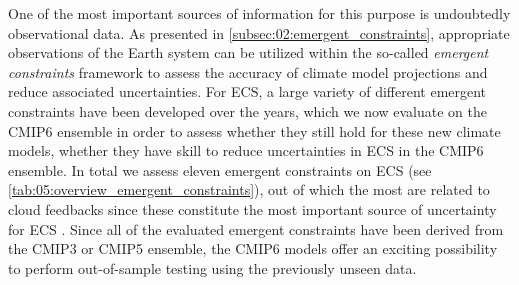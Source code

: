 One of the most important sources of information for this purpose is
undoubtedly observational data. As presented in
\cref{subsec:02:emergent_constraints}, appropriate observations of the Earth
system can be utilized within the so-called \emph{emergent constraints}
framework to assess the accuracy of climate model projections and reduce
associated uncertainties. For \ac{ECS}, a large variety of different emergent
constraints have been developed over the years, which we now evaluate on the
\acs{CMIP}6 ensemble in order to assess whether they still hold for these new
climate models, \ie{} whether they have skill to reduce uncertainties in
\ac{ECS} in the \acs{CMIP}6 ensemble. In total we assess eleven emergent
constraints on \ac{ECS} (see \cref{tab:05:overview_emergent_constraints}), out
of which the most are related to cloud feedbacks since these constitute the
most important source of uncertainty for \ac{ECS} . Since all of the
evaluated emergent constraints have been derived from the \acs{CMIP}3 or
\acs{CMIP}5 ensemble, the \acs{CMIP}6 models offer an exciting possibility to
perform out-of-sample testing using the previously unseen data.


